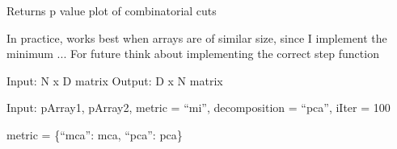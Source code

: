 \documentclass[letterpaper,10pt,english]{sphinxmanual}
\begin{document}
\begin{fulllineitems}
\end{fulllineitems}


\begin{fulllineitems}
\label{index:halla.stats.p_val_plot}
Returns p value plot of combinatorial cuts

In practice, works best when arrays are of similar size, since I implement the minimum ... 
For future think about implementing the correct step function

\end{fulllineitems}


\begin{fulllineitems}
\label{index:halla.stats.pca}
Input: N x D matrix 
Output: D x N matrix

\end{fulllineitems}


\begin{fulllineitems}
\label{index:halla.stats.permutation_test_by_representative}
Input: 
pArray1, pArray2, metric = ``mi'', decomposition = ``pca'', iIter = 100

metric = \{``mca'': mca, ``pca'': pca\}

\end{fulllineitems}

\end{document}
